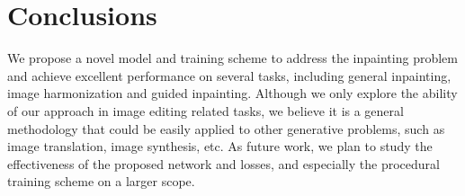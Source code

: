 \section{Conclusions}
We propose a novel model and training scheme to address the inpainting problem and achieve excellent performance on several tasks, including general inpainting, image harmonization and guided inpainting. Although we only explore the ability of our approach in image editing related tasks, we believe it is a general methodology that could be easily applied to other generative problems, such as image translation, image synthesis, etc. As future work, we plan to study the effectiveness of the proposed network and losses, and especially the procedural training scheme on a larger scope.